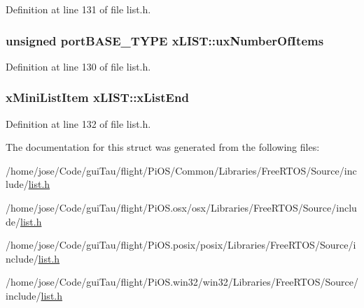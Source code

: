 Definition at line 131 of file list.\-h.

\hypertarget{structx_l_i_s_t_a4bcd10c0f3cdeb77ef08dac16bdd6571}{
\subsubsection[{ux\-Number\-Of\-Items}]{ unsigned port\-B\-A\-S\-E\-\_\-\-T\-Y\-P\-E x\-L\-I\-S\-T\-::ux\-Number\-Of\-Items}}\label{structx_l_i_s_t_a4bcd10c0f3cdeb77ef08dac16bdd6571}


Definition at line 130 of file list.\-h.

\hypertarget{structx_l_i_s_t_a62e557ea0367c5c644136997a32c94d5}{
\subsubsection[{x\-List\-End}]{ {\bf x\-Mini\-List\-Item} x\-L\-I\-S\-T\-::x\-List\-End}}\label{structx_l_i_s_t_a62e557ea0367c5c644136997a32c94d5}


Definition at line 132 of file list.\-h.



The documentation for this struct was generated from the following files\-:\begin{DoxyCompactItemize}
\item 
/home/jose/\-Code/gui\-Tau/flight/\-Pi\-O\-S/\-Common/\-Libraries/\-Free\-R\-T\-O\-S/\-Source/include/\hyperlink{_common_2_libraries_2_free_r_t_o_s_2_source_2include_2list_8h}{list.\-h}\item 
/home/jose/\-Code/gui\-Tau/flight/\-Pi\-O\-S.\-osx/osx/\-Libraries/\-Free\-R\-T\-O\-S/\-Source/include/\hyperlink{osx_2osx_2_libraries_2_free_r_t_o_s_2_source_2include_2list_8h}{list.\-h}\item 
/home/jose/\-Code/gui\-Tau/flight/\-Pi\-O\-S.\-posix/posix/\-Libraries/\-Free\-R\-T\-O\-S/\-Source/include/\hyperlink{posix_2posix_2_libraries_2_free_r_t_o_s_2_source_2include_2list_8h}{list.\-h}\item 
/home/jose/\-Code/gui\-Tau/flight/\-Pi\-O\-S.\-win32/win32/\-Libraries/\-Free\-R\-T\-O\-S/\-Source/include/\hyperlink{win32_2win32_2_libraries_2_free_r_t_o_s_2_source_2include_2list_8h}{list.\-h}\end{DoxyCompactItemize}
